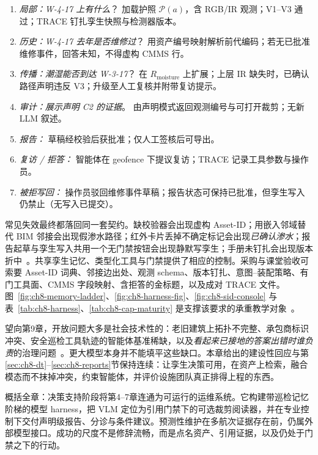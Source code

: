 \begin{enumerate}
\item \emph{局部：}\emph{W-4-17 上有什么}？ 加载护照 $\mathcal{P}(a)$，含 RGB/IR 观测；V1--V3 通过；TRACE 钉扎孪生快照与检测器版本。
\item \emph{历史：}\emph{W-4-17 去年是否维修过}？ 用资产编号映射解析前代编码；若无已批准维修事件，回答未知，不得虚构 CMMS 行。
\item \emph{传播：}\emph{潮湿能否到达 W-3-17}？ 在 $R_{\mathrm{moisture}}$ 上扩展；上层 IR 缺失时，已确认路径声明违反 V3；升级至人工复核并附带复访提示。
\item \emph{审计：}\emph{展示声明 C2 的证据}。 由声明模式返回观测编号与可打开裁剪；无新 LLM 叙述。
\item \emph{报告：} 草稿经校验后获批准；仅人工签核后可导出。
\item \emph{复访 / 拒答：} 智能体在 geofence 下提议复访；TRACE 记录工具参数与操作员。
\item \emph{被拒写回：} 操作员驳回维修事件草稿；报告状态可保持已批准，但孪生写入仍禁止（无写入已提交）。
\end{enumerate}

常见失效最终都落回同一套契约。缺校验器会出现虚构 Asset-ID；用嵌入邻域替代 BIM 邻接会出现假渗水路径；红外卡片丢掉不确定标记会出现\emph{已确认渗水}；报告起草与孪生写入共用一个无门禁按钮会出现静默写孪生；手册未钉扎会出现版本折中~\cite{ji2023,peng2024,lee2024ragsafety,luo2025llmdtrobot}。共享孪生记忆、类型化工具与门禁提供了相应的控制。采购与课堂验收可索要 Asset-ID 词典、邻接边出处、观测 schema、版本钉扎、意图--装配策略、有门工具面、CMMS 字段映射、含拒答的金标题，以及成对 TRACE 文件。图~\ref{fig:ch8-memory-ladder}、\ref{fig:ch8-harness-fig}、\ref{fig:ch8-sid-console} 与表~\ref{tab:ch8-harness}、\ref{tab:ch8-cap-maturity} 是支撑该要求的承重教学对象~\cite{yao2023react,hellin2025bimmas,buga2025llmfmsql}。

望向第9章，开放问题大多是社会技术性的：老旧建筑上拓扑不完整、承包商标识冲突、安全巡检工具轨迹的智能体基准稀缺，以及\emph{看起来已接地的答案出错时谁负责}的治理问题~\cite{saka2024gptconstruction,ma2026tenquestions}。更大模型本身并不能填平这些缺口。本章给出的建设性回应与第\ref{sec:ch8-dt}--\ref{sec:ch8-reports}节保持连续：让孪生决策可用，在资产上检索，融合模态而不抹掉冲突，约束智能体，并评价设施团队真正排得上程的东西。

概括全章：决策支持阶段将第4--7章连通为可运行的运维系统。它构建带巡检记忆阶梯的模型 harness，把 VLM 定位为引用门禁下的可选裁剪阅读器，并在专业控制下交付声明级报告、分诊与条件建议。预测性维护在多航次证据存在前，仍属外部模型接口。成功的尺度不是修辞流畅，而是点名资产、引用证据，以及仍处于门禁之下的行动。
